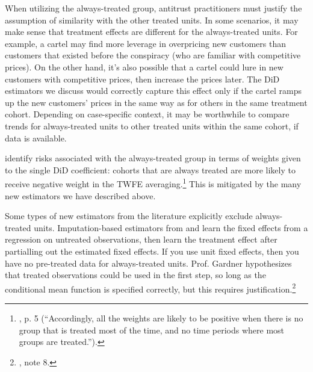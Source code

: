 \documentclass[12pt]{article}
\begin{document}
When utilizing the always-treated group, antitrust practitioners must justify the assumption of similarity with the other treated units. In some scenarios, it may make sense that treatment effects are different for the always-treated units. For example, a cartel may find more leverage in overpricing new customers than customers that existed before the conspiracy (who are familiar with competitive prices). On the other hand, it’s also possible that a cartel could lure in new customers with competitive prices, then increase the prices later. The DiD estimators we discuss would correctly capture this effect only if the cartel ramps up the new customers’ prices in the same way as for others in the same treatment cohort. Depending on case-specific context, it may be worthwhile to compare trends for always-treated units to other treated units within the same cohort, if data is available.

\citet{de2023two} identify risks associated with the always-treated group in terms of weights given to the single DiD coefficient: cohorts that are always treated are more likely to receive negative weight in the TWFE averaging.\footnote{\citet{de2023two}, p. 5 (“Accordingly, all the weights are likely to be positive when there is no group that is treated most of the time, and no time periods where most groups are treated.”).}  This is mitigated by the many new estimators we have described above.

Some types of new estimators from the literature explicitly exclude always-treated units. Imputation-based estimators from \citet{borusyak2024revisiting} and \citet{gardner2022a} learn the fixed effects from a regression on untreated observations, then learn the treatment effect after partialling out the estimated fixed effects. If you use unit fixed effects, then you have no pre-treated data for always-treated units. Prof. Gardner hypothesizes that treated observations could be used in the first step, so long as the conditional mean function is specified correctly, but this requires justification.\footnote{\citet{gardner2022a}, note 8.}
\end{document}
